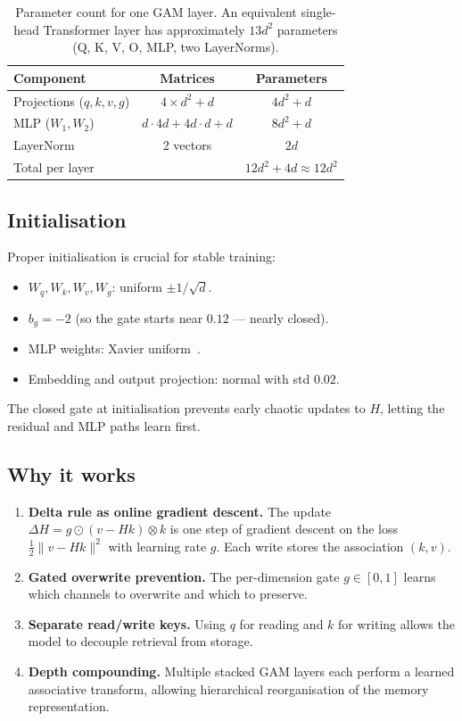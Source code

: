 \documentclass[11pt,a4paper]{article}
\begin{document}
\begin{table}[h]
\centering
\begin{tabular}{lcc}
\toprule
Component & Matrices & Parameters \\
\midrule
Projections ($q, k, v, g$) & $4 \times d^2 + d$ & $4d^2 + d$ \\
MLP ($W_1, W_2$) & $d\cdot4d + 4d\cdot d + d$ & $8d^2 + d$ \\
LayerNorm & 2 vectors & $2d$ \\
\midrule
Total per layer & & $12d^2 + 4d \approx 12d^2$ \\
\bottomrule
\end{tabular}
\caption{Parameter count for one GAM layer.  An equivalent single-head
Transformer layer has approximately $13d^2$ parameters (Q, K, V, O,
MLP, two LayerNorms).}
\label{tab:params}
\end{table}

\subsection{Initialisation}
\label{sec:init}

Proper initialisation is crucial for stable training:
\begin{itemize}[nosep]
  \item $W_q, W_k, W_v, W_g$: uniform $\pm 1/\sqrt{d}$.
  \item $b_g = -2$ (so the gate starts near $0.12$ --- nearly closed).
  \item MLP weights: Xavier uniform~\cite{glorot2010understanding}.
  \item Embedding and output projection: normal with std $0.02$.
\end{itemize}
The closed gate at initialisation prevents early chaotic updates to
$H$, letting the residual and MLP paths learn first.

\subsection{Why it works}
\label{sec:why}

\begin{enumerate}[nosep]
  \item \textbf{Delta rule as online gradient descent.}
    The update $\Delta H = g \odot (v - Hk) \otimes k$ is one step of
    gradient descent on the loss $\frac12\|v - Hk\|^2$ with learning
    rate $g$.  Each write stores the association $(k, v)$.
  \item \textbf{Gated overwrite prevention.}
    The per-dimension gate $g \in [0,1]$ learns which channels to
    overwrite and which to preserve.
  \item \textbf{Separate read/write keys.}
    Using $q$ for reading and $k$ for writing allows the model to
    decouple retrieval from storage.
  \item \textbf{Depth compounding.}
    Multiple stacked GAM layers each perform a learned associative
    transform, allowing hierarchical reorganisation of the memory
    representation.
\end{enumerate}
\end{document}
